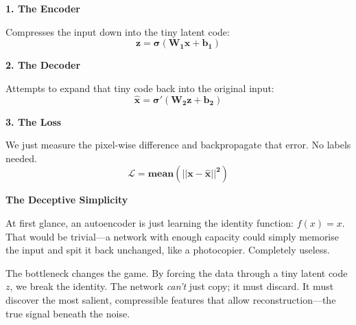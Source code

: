 \documentclass[11pt]{article}
\begin{document}
\vspace{0.3in}

{\Large\color{brandnavy}\textbf{1. The Encoder}}

Compresses the input down into the tiny latent code:
\vspace{-0.15in}
\[ \mathbf{z = \sigma(W_1x + b_1)} \]

\vspace{0.2in}

{\Large\color{brandnavy}\textbf{2. The Decoder}}

Attempts to expand that tiny code back into the original input:
\vspace{-0.15in}
\[ \mathbf{\widehat{x} = \sigma'(W_2z + b_2)} \]

\vspace{0.2in}

{\Large\color{brandnavy}\textbf{3. The Loss}}

We just measure the pixel-wise difference and backpropagate that error. No labels needed.
\vspace{-0.15in}
\[ \mathbf{\mathcal{L} = mean(||x - \widehat{x}||^2)} \]

\newpage


\vspace*{0.5in}

\begin{center}
{\fontsize{26}{30}\selectfont\color{brandnavy}\bfseries The Deceptive Simplicity}
\end{center}

\vspace{0.3in}

At first glance, an autoencoder is just learning the identity function: $f(x) = x$. That would be trivial—a network with enough capacity could simply memorise the input and spit it back unchanged, like a photocopier. Completely useless.

\vspace{0.2in}

The bottleneck changes the game. By forcing the data through a tiny latent code $z$, we break the identity. The network \textit{can't} just copy; it must discard. It must discover the most salient, compressible features that allow reconstruction—the true signal beneath the noise.

\vspace{0.2in}
\end{document}
